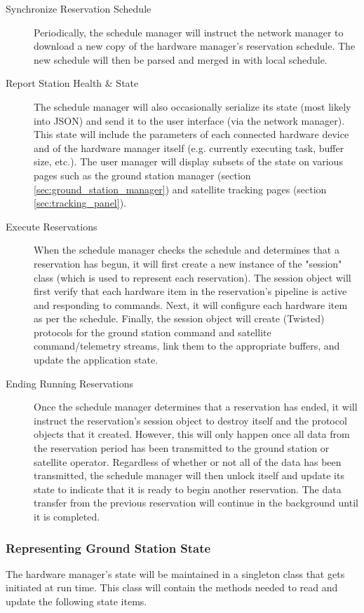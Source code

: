 \documentclass{mxl-design}
\begin{document}
\begin{description}
	\item[Synchronize Reservation Schedule] Periodically, the schedule manager will instruct the network manager to download a new copy of the hardware manager's reservation schedule. The new schedule will then be parsed and merged in with local schedule.
	\item[Report Station Health \& State] The schedule manager will also occasionally serialize its state (most likely into JSON) and send it to the user interface (via the network manager). This state will include the parameters of each connected hardware device and of the hardware manager itself (e.g. currently executing task, buffer size, etc.). The user manager will display subsets of the state on various pages such as the ground station manager (section \ref{sec:ground_station_manager}) and satellite tracking pages (section \ref{sec:tracking_panel}).
	\item[Execute Reservations] When the schedule manager checks the schedule and determines that a reservation has begun, it will first create a new instance of the "session" class (which is used to represent each reservation). The session object will first verify that each hardware item in the reservation's pipeline is active and responding to commands. Next, it will configure each hardware item as per the schedule. Finally, the session object will create (Twisted) protocols for the ground station command and satellite command/telemetry streams, link them to the appropriate buffers, and update the application state.
	\item[Ending Running Reservations] Once the schedule manager determines that a reservation has ended, it will instruct the reservation's session object to destroy itself and the protocol objects that it created. However, this will only happen once all data from the reservation period has been transmitted to the ground station or satellite operator. Regardless of whether or not all of the data has been transmitted, the schedule manager will then unlock itself and update its state to indicate that it is ready to begin another reservation. The data transfer from the previous reservation will continue in the background until it is completed.
\end{description}

\subsubsection{Representing Ground Station State}
\label{sec:state}
The hardware manager's state will be maintained in a singleton class that gets initiated at run time. This class will contain the methods needed to read and update the following state items.
\end{document}
